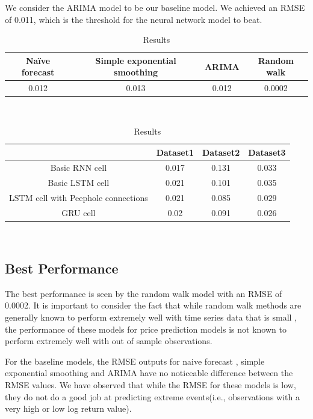 \documentclass[12pt]{article}%
\begin{document}
We consider the ARIMA model to be our baseline model. We achieved an RMSE of 0.011, which is the threshold for the neural network model to beat. 

\begin{center}
\begin{table}[h]
\centering
\begin{tabular}{ |c|c|c|c| } 
 \hline
 Naïve forecast		&Simple exponential smoothing&		ARIMA		&Random walk
  \\ 
\hline 
 0.012		&0.013	&	0.012	&	0.0002
  \\ 
\hline 
\end{tabular}
\\[10pt]
\caption{Results}
\end{table}
\end{center}




\begin{center}
\begin{table}[h]
\centering
\begin{tabular}{ |c|c|c|c| } 
 \hline
 & Dataset1 & Dataset2 & Dataset3  \\ 
\hline 
 Basic RNN cell &0.017 & 0.131	& 0.033  \\ 
\hline 
 Basic LSTM cell &0.021	&0.101	&0.035
  \\ 
 \hline
 LSTM cell with Peephole connections & 0.021&0.085&0.029
  \\ 
 \hline
 GRU cell & 0.02&0.091&0.026
  \\ 
 \hline
\end{tabular}
\\[10pt]
\caption{Results}
\end{table}
\end{center}

\subsection{Best Performance}
The best performance is seen by the random walk model with an RMSE of 0.0002. It is important to consider the fact that while random walk methods are generally known to perform extremely well with time series data that is small , the performance of these models for price prediction models is not known to perform extremely well with out of sample observations. 

For the baseline models, the RMSE outputs for naive forecast , simple exponential smoothing and ARIMA have no noticeable difference between the RMSE values. We have observed that while the RMSE for these models is low, they do not do a good job at predicting extreme events(i.e., observations with a very high or low log return value).  
\end{document}
